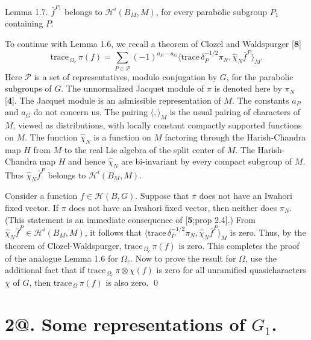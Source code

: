 \documentclass{amsart}
\begin{document}
\proclaim Lemma {1.7}. $\bar f^{P_1}$ belongs to ${\mathcal H}^i(B_M,M)$, for
every parabolic subgroup $P_1$ containing $P$.
\finishproclaim

To continue with Lemma 1.6, we recall
a theorem of Clozel and Waldspurger [{\bf 8}]
%
\begin{equation}\label{eqn:1.8}
  \text{trace}_{\,\Omega_c} \, \pi (f) =
  \sum_{P \in {\mathcal P}}
  (-1)^{a_P-a_G}
  \big\langle
    \text{trace}\, \delta_P^{-1/2} 
    \pi_N, 
    \hat \chi_N
    \bar f^P 
  \big\rangle_M.
\end{equation}
%
Here
  $ {\mathcal P} $
is a set of representatives, modulo conjugation by $G$, for
the parabolic subgroups of $G$.
The unnormalized Jacquet module of
  $ \pi $ is denoted here by $\pi_N$ 
[{\bf 4}]. The Jacquet module
is an admissible representation of $M$.
The constants
  $ a_P $
and
  $ a_G $
do not concern us.
The pairing
  $ \langle , \rangle _M $
is the usual pairing of characters of $M$,
viewed as distributions, with locally constant compactly
  supported functions on $M$.
  The function
  $ \hat {\chi}_N $
is a function on $M$ factoring through the Harish-Chandra
  map $H$ from $M$ to the
real Lie algebra of the split center of $M$.
The Harish-Chandra map $H$ and hence 
  $ \hat {\chi}_N $ 
are bi-invariant by every compact subgroup of $M$.
Thus
  $ \hat {\chi}_N \bar f^P$ belongs to  $\mathcal H^i(B_M, M) $.

Consider a function
  $ f \in {\mathcal H} (B,G) $.
Suppose that 
  $ \pi $
does not have an Iwahori fixed vector.
If 
  $ \pi $
does not have an Iwahori fixed vector, then neither does
  $ \pi_N $.
(This statement is an immediate consequence of [{\bf 5};prop 2.4].)
From
  $ \hat {\chi}_N \bar f^P \in {\mathcal H}^i
    (B_M,M) $,
it follows that
  $ \langle
      \text{trace} \, \delta_P^{-1/2}
      \pi_N,
      \hat \chi_N
      \bar f^P
    \rangle_M$ %
is zero.
Thus, by the theorem of Clozel-Waldspurger,
$
  \text{trace}_{\,\Omega_c}\, \pi (f)
$ is zero.
%
This completes the proof of the analogue Lemma 1.6 for $\Omega_c$.
Now to prove the result for $\Omega$, use the additional fact
that if $\text{trace}_{\,\Omega_c}\,\pi\otimes\chi(f)$ is zero for all
unramified quasicharacters $\chi$ of $G$, then 
$\text{trace}_{\,\Omega}\,\pi(f)$ is also zero.
\qed
\finishpproclaim

\section{{\bf 2@.  Some representations of $G_1$.}}
\end{document}

